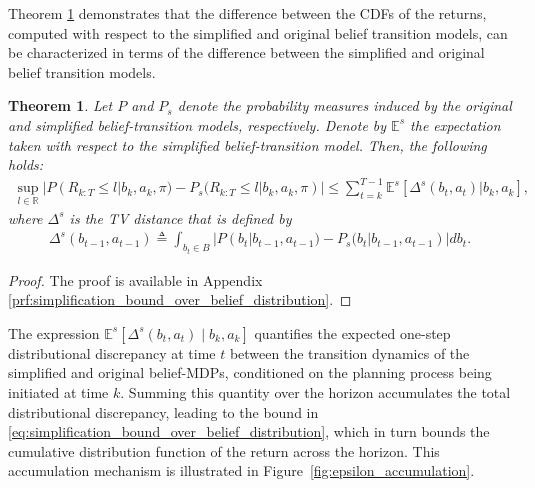 \documentclass[acmlarge, manuscript, screen, review, natbib=false, oneside]{acmart}
\newtheorem{theorem}{Theorem}[section]
\begin{document}
Theorem \ref{thm:simplification_bound_over_belief_distribution} demonstrates that the difference between the CDFs of the returns, computed with respect to the simplified and original belief transition models, can be characterized in terms of the difference between the simplified and original belief transition models. 
\begin{theorem}\label{thm:simplification_bound_over_belief_distribution} 	Let $P$ and $P_s$ denote the probability measures induced by the original and simplified belief-transition models, respectively. Denote by $\mathbb{E}^s$ the expectation taken with respect to the simplified belief-transition model. Then, the following holds:
	\begin{equation}\label{eq:simplification_bound_over_belief_distribution}
		\begin{aligned}
			\sup_{l\in \mathbb{R}}|P(R_{k:T} \leq l|b_k, a_k, \pi) \! -\! P_s(R_{k:T} \leq l|b_k, a_k, \pi)| \!
			\leq \!\! \! \sum_{t=k}^{T-1} \mathbb{E}^s[\Delta^s(b_t, a_t)|b_k, a_k],
		\end{aligned}
	\end{equation}
	where $\Delta^s$ is the TV distance that is defined by
	\begin{equation}\label{eq:TVdistBel}
		\begin{aligned}
			\Delta^s(b_{t-1},a_{t-1})
			\triangleq \int_{b_t\in B} |P(b_t|b_{t-1},a_{t-1})-P_s(b_t|b_{t-1},a_{t-1})|db_t.
		\end{aligned}
	\end{equation}
\end{theorem}
\begin{proof}
	The proof is available in Appendix \ref{prf:simplification_bound_over_belief_distribution}.
\end{proof}
The expression $\mathbb{E}^s[\Delta^s(b_t, a_t) \mid b_k, a_k]$ quantifies the expected one-step distributional discrepancy at time $t$ between the transition dynamics of the simplified and original belief-MDPs, conditioned on the planning process being initiated at time $k$. Summing this quantity over the horizon accumulates the total distributional discrepancy, leading to the bound in \eqref{eq:simplification_bound_over_belief_distribution}, which in turn bounds the cumulative distribution function of the return across the horizon. This accumulation mechanism is illustrated in Figure~\ref{fig:epsilon_accumulation}.
\end{document}
